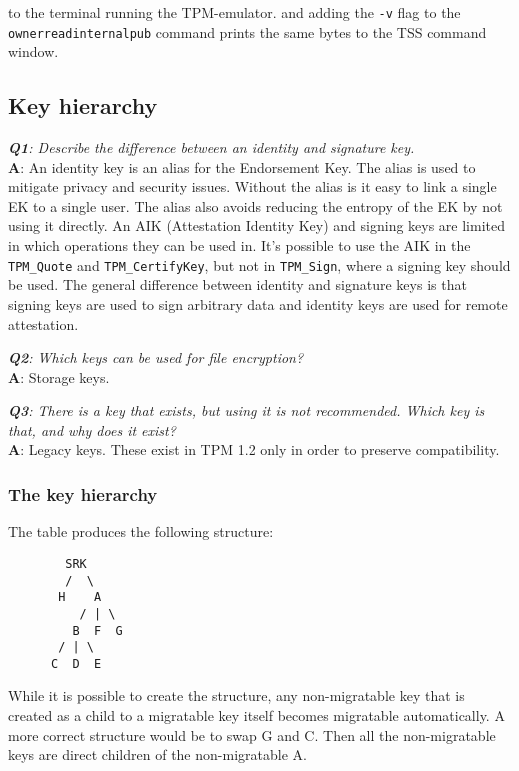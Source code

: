 \documentclass[10pt]{article}
\newcommand{\command}[1]{\texttt{#1}}
\newcommand{\Q}[2]{\textit{\textbf{Q#1}: #2}}
\newcommand{\A}[1]{\textbf{A}: #1}
\begin{document}
      to the terminal running the TPM-emulator.
      and adding the \command{-v} flag to the \\
      \command{ownerreadinternalpub} command
      prints the same bytes to the TSS command window.

  \subsection{Key hierarchy}

    \Q{1}{Describe the difference between an identity and signature key.}\\
    \A{
      An identity key is an alias for the Endorsement Key. The alias is used
      to mitigate privacy and security issues. Without the alias is it easy to
      link a single EK to a single user. The alias also avoids reducing the
      entropy of the EK by not using it directly. An AIK (Attestation Identity
      Key) and signing keys are limited in which operations they can be used
      in. It's possible to use the AIK in the \command{TPM\_Quote} and
      \command{TPM\_CertifyKey}, but not in \command{TPM\_Sign}, where a
      signing key should be used. The general difference between identity and
      signature keys is that signing keys are used to sign arbitrary data and
      identity keys are used for remote attestation.
  }

    \Q{2}{Which keys can be used for file encryption?}\\
    \A{Storage keys.}

    \Q{3}{
      There is a key that exists, but using it is not recommended. Which key
      is that, and why does it exist?
    }\\
    \A{
      Legacy keys. These exist in TPM 1.2 only in order to preserve compatibility.
    }

    \subsubsection{The key hierarchy}

    The table produces the following structure:

\begin{lstlisting}
        SRK
        /  \
       H    A
          / | \
         B  F  G
       / | \
      C  D  E
\end{lstlisting}

    While it is possible to create the structure, any non-migratable key that
    is created as a child to a migratable key itself becomes migratable
    automatically.  A more correct structure would be to swap G and C.
    Then all the non-migratable keys are direct children of the non-migratable A.
\end{document}
